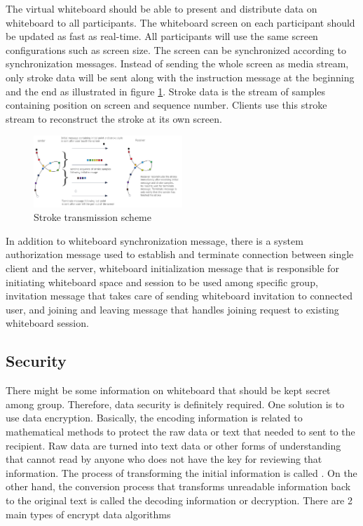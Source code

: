 \documentclass[conference]{IEEEtran}
\begin{document}
The virtual whiteboard should be able to present and distribute data on whiteboard to all participants. 
The whiteboard screen on each participant should be updated as fast as real-time. 
All participants will use the same screen configurations such as screen size. 
The screen can be synchronized according to synchronization messages. 
Instead of sending the whole screen as media stream, only stroke data will be sent along with the instruction message at the beginning and the end as illustrated in figure \ref{fig:2}. 
Stroke data is the stream of samples containing position on screen and sequence number. 
Clients use this stroke stream to reconstruct the stroke at its own screen. 

\begin{figure}[h]
\begin{center}
\includegraphics[width=0.5\textwidth]{iw_stroke_transmission.png}
\caption{Stroke transmission scheme}
\label{fig:2}
\end{center}
\end{figure}

In addition to whiteboard synchronization message, there is a system authorization message used to establish and terminate connection between single client and the server, whiteboard initialization message that is responsible for initiating whiteboard space and session to be used among specific group, invitation message that takes care of sending whiteboard invitation to connected user, and joining and leaving message that handles joining request to existing whiteboard session.

\subsection{Security}

There might be some information on whiteboard that should be kept secret among group. 
Therefore, data security is definitely required. 
One solution is to use data encryption.
Basically, the encoding information is related to mathematical methods to protect the raw data or text that needed to sent to the recipient. 
Raw data are turned into text data or other forms of understanding that cannot read by anyone who does not have the key for reviewing that information. 
The process of transforming the initial information is called . 
On the other hand, the conversion process that transforms unreadable information back to the original text is called the decoding information or decryption. There are 2 main types of encrypt data algorithms
\end{document}
